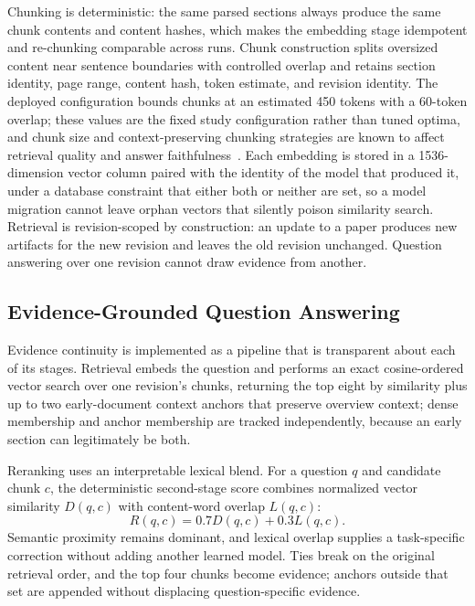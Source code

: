 Chunking is deterministic: the same parsed sections always produce the same chunk contents and content hashes, which makes the embedding stage idempotent and re-chunking comparable across runs.
Chunk construction splits oversized content near sentence boundaries with controlled overlap and retains section identity, page range, content hash, token estimate, and revision identity.
The deployed configuration bounds chunks at an estimated 450 tokens with a 60-token overlap; these values are the fixed study configuration rather than tuned optima, and chunk size and context-preserving chunking strategies are known to affect retrieval quality and answer faithfulness~\cite{wang2024bestpractices}.
Each embedding is stored in a 1536-dimension vector column paired with the identity of the model that produced it, under a database constraint that either both or neither are set, so a model migration cannot leave orphan vectors that silently poison similarity search.
Retrieval is revision-scoped by construction: an update to a paper produces new artifacts for the new revision and leaves the old revision unchanged. Question answering over one revision cannot draw evidence from another.

\subsection{Evidence-Grounded Question Answering}
\label{subsec:backend-qa}

Evidence continuity is implemented as a pipeline that is transparent about each of its stages.
Retrieval embeds the question and performs an exact cosine-ordered vector search over one revision's chunks, returning the top eight by similarity plus up to two early-document context anchors that preserve overview context; dense membership and anchor membership are tracked independently, because an early section can legitimately be both.

Reranking uses an interpretable lexical blend. For a question \(q\) and candidate chunk \(c\), the deterministic second-stage score combines normalized vector similarity \(D(q,c)\) with content-word overlap \(L(q,c)\):
\begin{equation}
  R(q,c)=0.7D(q,c)+0.3L(q,c).
  \label{eq:qa-rerank}
\end{equation}
Semantic proximity remains dominant, and lexical overlap supplies a task-specific correction without adding another learned model. Ties break on the original retrieval order, and the top four chunks become evidence; anchors outside that set are appended without displacing question-specific evidence.

